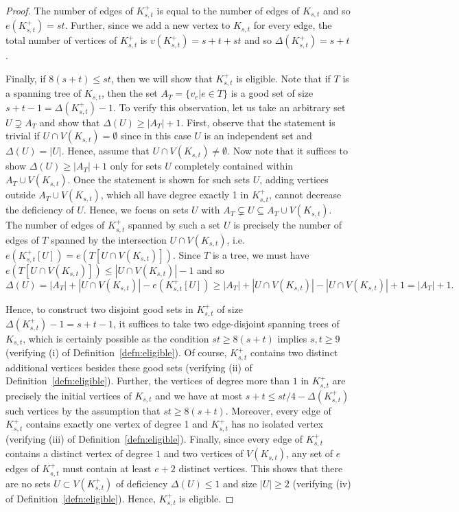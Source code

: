\begin{proof}
The number of edges of $K_{s, t}^+$ is equal to the number of edges of $K_{s, t}$ and so $e(K_{s, t}^+)=st$. Further, since we add a new vertex to $K_{s, t}$ for every edge, the total number of vertices of $K_{s, t}^+$ is $v(K_{s, t}^+)=s+t+st$ and so $\Delta(K_{s, t}^+)=s+t$.

Finally, if $8(s+t)\leq st$, then we will show that $K_{s, t}^+$ is eligible. Note that if $T$ is a spanning tree of $K_{s, t}$, then the set $A_T=\{v_e | e\in T\}$ is a good set of size $s+t-1=\Delta(K_{s, t}^+)-1$. To verify this observation, let us take an arbitrary set $U\supsetneq A_T$ and show that $\Delta(U)\geq |A_T|+1$. First, observe that the statement is trivial if $U\cap V(K_{s,t})=\emptyset$ since in this case $U$ is an independent set and $\Delta(U)=|U|$. Hence, assume that $U\cap V(K_{s,t})\neq \emptyset$. Now note that it suffices to show $\Delta(U)\geq |A_T|+1$ only for sets $U$ completely contained within $A_T\cup V(K_{s, t})$. Once the statement is shown for such sets $U$, adding vertices outside $A_T\cup V(K_{s, t})$, which all have degree exactly 1 in $K_{s, t}^+$, cannot decrease the deficiency of $U$. Hence, we focus on sets $U$ with $A_T\subsetneq U\subseteq A_T\cup V(K_{s, t})$. The number of edges of $K_{s, t}^+$ spanned by such a set $U$ is precisely the number of edges of $T$ spanned by the intersection $U\cap V(K_{s, t})$, i.e. $e(K_{s, t}^+[U])=e(T[U\cap V(K_{s, t})])$. Since $T$ is a tree, we must have $e(T[U\cap V(K_{s, t})])\leq |U\cap V(K_{s, t})|-1$ and so 
\[\Delta(U)=|A_T|+|U\cap V(K_{s, t})|-e(K_{s, t}^+[U])\geq |A_T|+|U\cap V(K_{s, t})|-|U\cap V(K_{s, t})|+1=|A_T|+1.\]

Hence, to construct two disjoint good sets in $K_{s, t}^+$ of size $\Delta(K_{s, t}^+)-1=s+t-1$, it suffices to take two edge-disjoint spanning trees of $K_{s, t}$, which is certainly possible as the condition $st\geq 8(s+t)$ implies $s, t\geq 9$ (verifying (i) of Definition~\ref{defn:eligible}). Of course, $K_{s, t}^+$ contains two distinct additional vertices besides these good sets (verifying (ii) of Definition~\ref{defn:eligible}). Further, the vertices of degree more than $1$ in $K_{s, t}^+$ are precisely the initial vertices of $K_{s, t}$ and we have at most $s+t\leq st/4-\Delta(K_{s, t}^+)$ such vertices by the assumption that $st\geq 8(s+t)$. Moreover, every edge of $K_{s, t}^+$ contains exactly one vertex of degree 1 and $K_{s,t}^+$ has no isolated vertex (verifying (iii) of Definition~\ref{defn:eligible}). Finally, since every edge of $K_{s, t}^+$ contains a distinct vertex of degree $1$ and two vertices of $V(K_{s, t})$, any set of $e$ edges of $K_{s, t}^+$ must contain at least $e+2$ distinct vertices. This shows that there are no sets $U\subset V(K_{s, t}^+)$ of deficiency $\Delta(U)\leq 1$ and size $|U|\geq 2$ (verifying (iv) of Definition~\ref{defn:eligible}). Hence, $K_{s, t}^+$ is eligible.
\end{proof}

